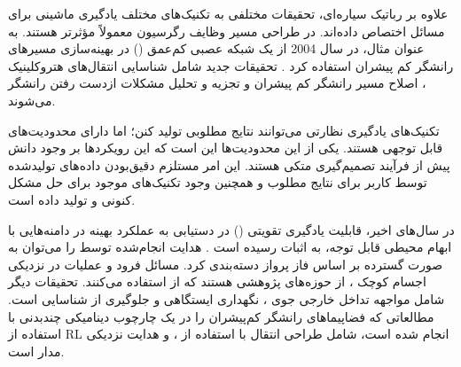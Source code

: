 \documentclass[a4paper]{article}
\begin{document}
{علاوه بر رباتیک سیاره‌ای، تحقیقات مختلفی به تکنیک‌های مختلف یادگیری ماشینی برای مسائل  اختصاص داده‌اند. در طراحی مسیر وظایف رگرسیون معمولاً مؤثرتر هستند. به عنوان مثال،  در سال 2004 از یک شبکه عصبی کم‌عمق () در بهینه‌سازی مسیرهای رانشگر کم پیشران استفاده کرد 
\cite{dachwald2004evolutionary}.
 تحقیقات جدید شامل شناسایی انتقال‌های هتروکلینیک \cite{desmet2019identifying}، اصلاح مسیر رانشگر کم پیشران\cite{parrish2018lowthrust} و تجزیه و تحلیل مشکلات ازدست رفتن رانشگر\cite{rubinsztejn2020neural} می‌شوند.
 
تکنیک‌های یادگیری نظارتی می‌توانند نتایج مطلوبی تولید کنن؛ اما دارای محدودیت‌های قابل توجهی هستند. یکی از این محدودیت‌ها این است که این رویکردها بر وجود دانش پیش از فرآیند تصمیم‌گیری متکی هستند. این امر مستلزم دقیق‌بودن داده‌های تولید‌شده توسط کاربر برای نتایج مطلوب و همچنین وجود تکنیک‌های موجود برای حل مشکل کنونی و تولید داده است.

  
  در سال‌های اخیر، قابلیت یادگیری تقویتی () در دستیابی به عملکرد بهینه در دامنه‌هایی با ابهام محیطی قابل توجه، به اثبات رسیده است  \cite{heess2017emergence, silver2017mastering}.
  هدایت انجام‌شده توسط  را می‌توان به صورت گسترده بر اساس فاز پرواز دسته‌بندی کرد.
  مسائل فرود \cite{furfaro2020adaptive, gaudet2020deep} 
   و عملیات در نزدیکی اجسام کوچک
   \cite{gaudet2020terminal, gaudet2020six}،
    از حوزه‌های پژوهشی هستند که از  استفاده می‌کنند.
  تحقیقات دیگر شامل مواجهه تداخل خارجی جوی \cite{gaudet2020reinforcement}،
   نگهداری ایستگاهی \cite{guzzetti2019reinforcement}  و جلوگیری از شناسایی \cite{reiter2020augmenting} است.
  مطالعاتی که فضاپیماهای رانشگر کم‌پیشران را در یک چارچوب دینامیکی چندبدنی با استفاده از RL انجام شده است، شامل طراحی انتقال با استفاده از  
   \cite{dasstuart2020rapid}، 
     \cite{miller2019lowthrust}
      و  هدایت نزدیکی مدار  \cite{sullivan2020using} است.
      
}
\end{document}
